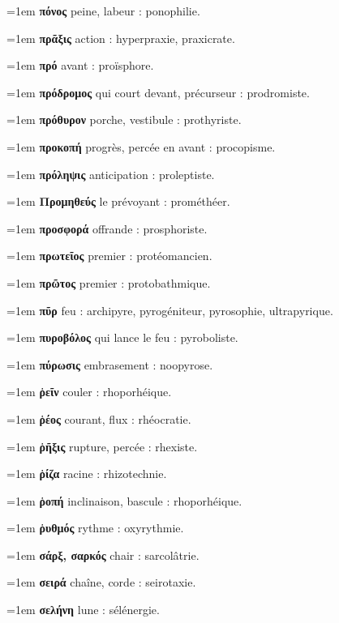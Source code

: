 \hangindent=1em \textbf{πόνος} peine, labeur : ponophilie.\par
\hangindent=1em \textbf{πρᾶξις} action : hyperpraxie, praxicrate.\par
\hangindent=1em \textbf{πρό} avant : proïsphore.\par
\hangindent=1em \textbf{πρόδρομος} qui court devant, précurseur : prodromiste.\par
\hangindent=1em \textbf{πρόθυρον} porche, vestibule : prothyriste.\par
\hangindent=1em \textbf{προκοπή} progrès, percée en avant : procopisme.\par
\hangindent=1em \textbf{πρόληψις} anticipation : proleptiste.\par
\hangindent=1em \textbf{Προμηθεύς} le prévoyant : prométhéer.\par
\hangindent=1em \textbf{προσφορά} offrande : prosphoriste.\par
\hangindent=1em \textbf{πρωτεῖος} premier : protéomancien.\par
\hangindent=1em \textbf{πρῶτος} premier : protobathmique.\par
\hangindent=1em \textbf{πῦρ} feu : archipyre, pyrogéniteur, pyrosophie, ultrapyrique.\par
\hangindent=1em \textbf{πυροβόλος} qui lance le feu : pyroboliste.\par
\hangindent=1em \textbf{πύρωσις} embrasement : noopyrose.\par
\hangindent=1em \textbf{ῥεῖν} couler : rhoporhéique.\par
\hangindent=1em \textbf{ῥέος} courant, flux : rhéocratie.\par
\hangindent=1em \textbf{ῥῆξις} rupture, percée : rhexiste.\par
\hangindent=1em \textbf{ῥίζα} racine : rhizotechnie.\par
\hangindent=1em \textbf{ῥοπή} inclinaison, bascule : rhoporhéique.\par
\hangindent=1em \textbf{ῥυθμός} rythme : oxyrythmie.\par
\hangindent=1em \textbf{σάρξ, σαρκός} chair : sarcolâtrie.\par
\hangindent=1em \textbf{σειρά} chaîne, corde : seirotaxie.\par
\hangindent=1em \textbf{σελήνη} lune : sélénergie.\par

